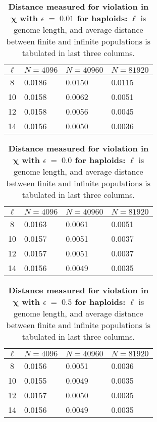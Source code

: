 \begin{table}[ht]
\caption{\textbf{Distance measured for violation in $\bm{\chi}$ with $\epsilon \;=\; 0.01$  for haploids:} $\ell$ is genome length, 
and average distance between finite and 
infinite populations is tabulated in last three columns.}
\centering
\begin{tabularx}{0.75\textwidth}{ c *{3}{X}}
\toprule
$\ell$ & $N = 4096$ & $N = 40960$ & $N = 81920$  \\
\midrule
8 & 0.0186	&  0.0150 	& 0.0115 \\
10 & 0.0158	&  0.0062 	& 0.0051 \\ 
12 & 0.0158	&  0.0056	& 0.0045 \\
14 & 0.0156	&  0.0050	& 0.0036 \\ 
\bottomrule
\end{tabularx}
\label{distanceChiHapEps0.01}
\end{table} 

\begin{table}[ht]
\caption{\textbf{Distance measured for violation in $\bm{\chi}$ with $\epsilon \;=\; 0.0$  for haploids:} $\ell$ is genome length, 
and average distance between finite and 
infinite populations is tabulated in last three columns.}
\centering
\begin{tabularx}{0.75\textwidth}{ c *{3}{X}}
\toprule
$\ell$ & $N = 4096$ & $N = 40960$ & $N = 81920$  \\
\midrule
8 & 0.0163	& 0.0061 	& 0.0051 \\
10 & 0.0157	&  0.0051	& 0.0037 \\	
12 & 0.0157	&  0.0051	& 0.0037 \\	
14 & 0.0156	&  0.0049	& 0.0035 \\
\bottomrule
\end{tabularx}
\label{distanceChiHapEps0.1}
\end{table} 

\begin{table}[ht]
\caption{\textbf{Distance measured for violation in $\bm{\chi}$ with $\epsilon \;=\; 0.5$  for haploids:} $\ell$ is genome length, 
and average distance between finite and 
infinite populations is tabulated in last three columns.}
\centering
\begin{tabularx}{0.75\textwidth}{ c *{3}{X}}
\toprule
$\ell$ & $N = 4096$ & $N = 40960$ & $N = 81920$  \\
\midrule
8 & 0.0156	&  0.0051	& 0.0036 \\
10 & 0.0155	&  0.0049	& 0.0035 \\
12 & 0.0157	&  0.0050	& 0.0035 \\
14 & 0.0156	&  0.0049	& 0.0035 \\      
\bottomrule
\end{tabularx}
\label{distanceChiHapEps0.5}
\end{table} 



